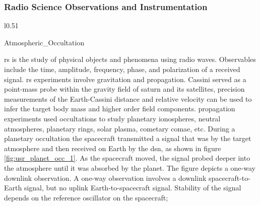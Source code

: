 \documentclass{article}
\begin{document}
            \subsubsection{Radio Science Observations
                           and Instrumentation}
                \label{subsubsec:usr_rad_sci_obs_and_inst}
                \begin{wrapfigure}[11]{l}{0.51\textwidth}
                    \centering
                    \captionsetup{type=figure}
                    
                              {Atmospheric_Occultation}
                    \caption{Refraction via an 
                             Atmospheric Occultation}
                    \label{fig:usr_planet_occ_1}
                \end{wrapfigure}
                \gls{rs} is the study of physical objects and
                phenomena using \gls{radio waves}.
                Observables include the time, \gls{amplitude},
                \gls{frequency}, \gls{phase}, and
                \gls{polarization} of a received signal.
                \gls{rs} experiments involve \gls{gravitation}
                and \gls{propagation}. Cassini served as a
                point-mass probe within the gravity field
                of \gls{saturn} and its satellites, precision
                measurements of the Earth-Cassini distance
                and \gls{relative velocity} can be used to
                infer the target body mass and higher order
                field components. \Gls{propagation} experiments
                used \glspl{occultation} to study planetary
                \glspl{ionosphere}, \glspl{neutral atmosphere},
                \gls{planetary rings}, \gls{solar plasma},
                \gls{cometary comae}, etc. During a planetary
                \gls{occultation} the spacecraft transmitted
                a signal that was
                 by the
                target atmosphere and then received on Earth
                by the \gls{dsn}, as shown in figure
                \ref{fig:usr_planet_occ_1}. As the spacecraft
                moved, the signal probed deeper into the
                atmosphere until it was absorbed by the planet.
                The figure depicts a one-way \gls{downlink}
                observation. A \gls{one-way observation}
                involves a \gls{downlink} spacecraft-to-Earth
                signal, but no \gls{uplink} Earth-to-spacecraft
                signal. Stability of the signal depends on the
                reference \gls{oscillator} on the spacecraft;
\end{document}
